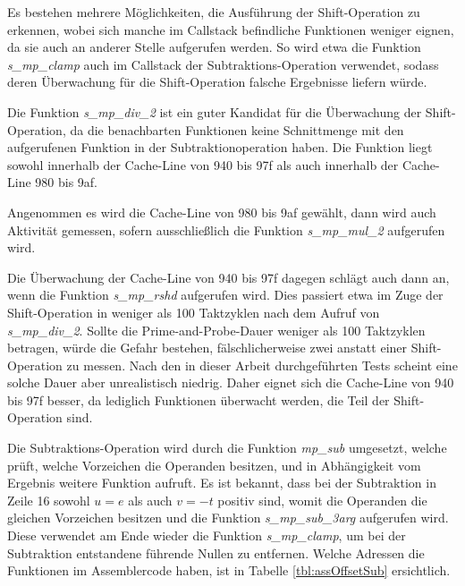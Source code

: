 Es bestehen mehrere Möglichkeiten, die Ausführung der Shift-Operation zu erkennen, wobei sich manche im Callstack befindliche Funktionen weniger eignen, da sie auch an anderer Stelle aufgerufen werden.
So wird etwa die Funktion \textit{s_mp_clamp} auch im Callstack der Subtraktions-Operation verwendet, sodass deren Überwachung für die Shift-Operation falsche Ergebnisse liefern würde.

Die Funktion \textit{s_mp_div_2} ist ein guter Kandidat für die Überwachung der Shift-Operation, da die benachbarten Funktionen keine Schnittmenge mit den aufgerufenen Funktion in der Subtraktionoperation haben.
Die Funktion liegt sowohl innerhalb der Cache-Line von 940 bis 97f als auch innerhalb der Cache-Line 980 bis 9af.

Angenommen es wird die Cache-Line von 980 bis 9af gewählt, dann wird auch Aktivität gemessen, sofern ausschließlich die Funktion \textit{s_mp_mul_2} aufgerufen wird.

Die Überwachung der Cache-Line von 940 bis 97f dagegen schlägt auch dann an, wenn die Funktion \textit{s_mp_rshd} aufgerufen wird.
Dies passiert etwa im Zuge der Shift-Operation in weniger als 100 Taktzyklen nach dem Aufruf von \textit{s_mp_div_2}.
Sollte die Prime-and-Probe-Dauer weniger als 100 Taktzyklen betragen, würde die Gefahr bestehen, fälschlicherweise zwei anstatt einer Shift-Operation zu messen.
Nach den in dieser Arbeit durchgeführten Tests scheint eine solche Dauer aber unrealistisch niedrig.
Daher eignet sich die Cache-Line von 940 bis 97f besser, da lediglich Funktionen überwacht werden, die Teil der Shift-Operation sind.


Die Subtraktions-Operation wird durch die Funktion \textit{mp_sub} umgesetzt, welche prüft, welche Vorzeichen die Operanden besitzen, und in Abhängigkeit vom Ergebnis weitere Funktion aufruft.
Es ist bekannt, dass bei der Subtraktion in Zeile 16 sowohl $u=e$ als auch $v=-t$ positiv sind, womit die Operanden die gleichen Vorzeichen besitzen und die Funktion \textit{s_mp_sub_3arg} aufgerufen wird.
Diese verwendet am Ende wieder die Funktion \textit{s_mp_clamp}, um bei der Subtraktion entstandene führende Nullen zu entfernen.
Welche Adressen die Funktionen im Assemblercode haben, ist in Tabelle \ref{tbl:assOffsetSub} ersichtlich. 



